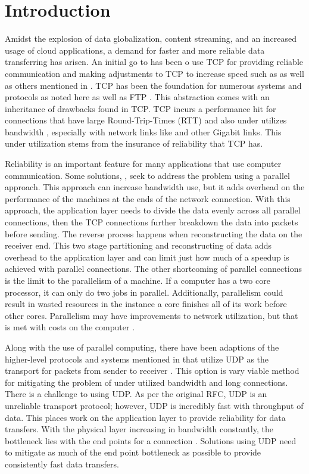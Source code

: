 \chapter{Introduction}

Amidst the explosion of data globalization, content streaming, and an increased usage of cloud applications, a demand for faster and more reliable data transferring has arisen. An initial go to has been o use TCP for providing reliable communication and making adjustments to TCP to increase speed such as \cite{brakmo1995tcp}\cite{wei2006fast}\cite{ha2008cubic} as well as others mentioned in \cite{ha2008cubic}\cite{He2002}. TCP has been the foundation for numerous systems and protocols as noted here \cite{Fan2010} as well as FTP \cite{Bhushan1972}. This abstraction comes with an inheritance of drawbacks found in TCP. TCP incurs a performance hit for connections that have large Round-Trip-Times (RTT) and also under utilizes bandwidth \cite{Fan2010}, especially with network links like \cite{Pfister2001} and other Gigabit links. This under utilization stems from the insurance of reliability that TCP has.

Reliability is an important feature for many applications that use computer communication. Some solutions, \cite{Allman1995}\cite{Allman1997}\cite{Sivakumar2000psockets}, seek to address the problem using a parallel approach. This approach can increase bandwidth use, but it adds overhead on the performance of the machines at the ends of the network connection. With this approach, the application layer needs to divide the data evenly across all parallel connections, then the TCP connections further breakdown the data into packets before sending. The reverse process happens when reconstructing the data on the receiver end. This two stage partitioning and reconstructing of data adds overhead to the application layer and can limit just how much of a speedup is achieved with parallel connections. The other shortcoming of parallel connections is the limit to the parallelism of a machine. If a computer has a two core processor, it can only do two jobs in parallel. Additionally, parallelism could result in wasted resources in the instance a core finishes all of its work before other cores. Parallelism may have improvements to network utilization, but that is met with costs on the computer \cite{Leijen2009}.

Along with the use of parallel computing, there have been adaptions of the higher-level protocols and systems mentioned in \cite{Fan2010} that utilize UDP as the transport for packets from sender to receiver \cite{He2002}\cite{Aspera2016}\cite{Fan2010}\cite{Meiss2007}\cite{gu2007udt}. This option is vary viable method for mitigating the problem of under utilized bandwidth and long connections. There is a challenge to using UDP. As per the original RFC, UDP is an unreliable transport protocol; however, UDP is incredibly fast with throughput of data. This places work on the application layer to provide reliability for data transfers. With the physical layer increasing in bandwidth constantly, the bottleneck lies with the end points for a connection \cite{Aspera2016}\cite{Fan2010}. Solutions using UDP need to mitigate as much of the end point bottleneck as possible to provide consistently fast data transfers.

